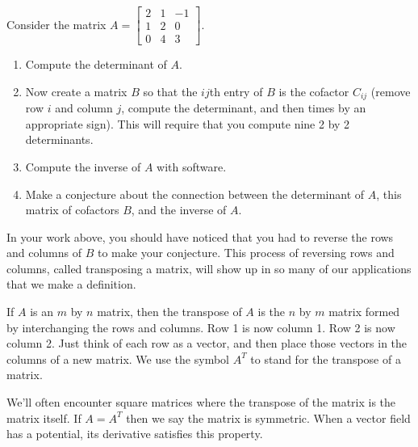 \begin{problem}
Consider the matrix
$A=\begin{bmatrix}
2&1&-1\\1&2&0\\0&4&3 
\end{bmatrix}.$
\begin{enumerate}
 \item 
 Compute the determinant of $A$. 
 \item 
{}%
Now create a matrix $B$ so that the $ij$th entry of $B$ is the cofactor $C_{ij}$ (remove row $i$ and column $j$, compute the determinant, and then times by an appropriate sign).  
This will require that you compute nine 2 by 2 determinants.  
 \item 
Compute the inverse of $A$ with software. 
 \item 
Make a conjecture about the connection between the determinant of $A$, this matrix of cofactors $B$, and the inverse of $A$.  
\end{enumerate}
\end{problem}


In your work above, you should have noticed that you had to reverse the rows and columns of $B$ to make your conjecture.  This process of reversing rows and columns, called transposing a matrix, will show up in so many of our applications that we make a definition.

\begin{definition}
 If $A$ is an $m$ by $n$ matrix, then the transpose of $A$ is the $n$ by $m$ matrix formed by interchanging the rows and columns.  Row 1 is now column 1. Row 2 is now column 2.  Just think of each row as a vector, and then place those vectors in the columns of a new matrix.  We use the symbol $A^T$ to stand for the transpose of a matrix.

We'll often encounter square matrices where the transpose of the matrix is the matrix itself.  If $A=A^T$ then we say the matrix is symmetric. When a vector field has a potential, its derivative satisfies this property. 
\end{definition}









